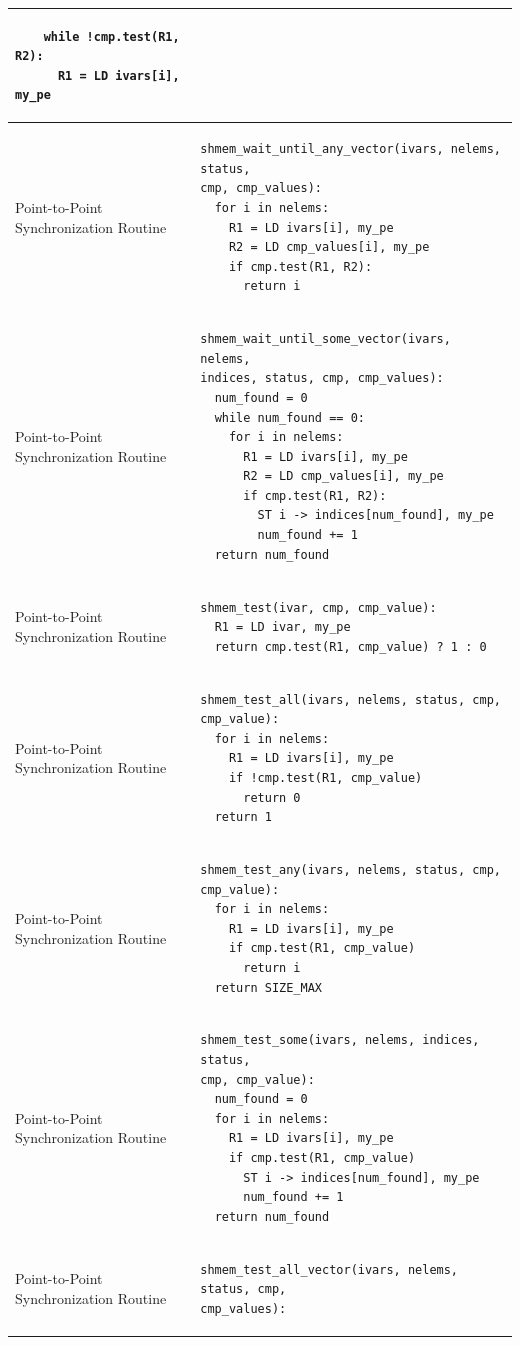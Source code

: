\begin{longtable}{|m{}|m{}|}
\begin{BVerbatim}
    while !cmp.test(R1, R2):
      R1 = LD ivars[i], my_pe
    \end{BVerbatim}
    \tabularnewline\hline
Point-to-Point Synchronization Routine
    & \begin{BVerbatim}
shmem_wait_until_any_vector(ivars, nelems, status,
cmp, cmp_values):
  for i in nelems:
    R1 = LD ivars[i], my_pe
    R2 = LD cmp_values[i], my_pe
    if cmp.test(R1, R2):
      return i
    \end{BVerbatim}
    \tabularnewline\hline
Point-to-Point Synchronization Routine
    & \begin{BVerbatim}
shmem_wait_until_some_vector(ivars, nelems,
indices, status, cmp, cmp_values):
  num_found = 0
  while num_found == 0:
    for i in nelems:
      R1 = LD ivars[i], my_pe
      R2 = LD cmp_values[i], my_pe
      if cmp.test(R1, R2):
        ST i -> indices[num_found], my_pe
        num_found += 1
  return num_found
    \end{BVerbatim}
    \tabularnewline\hline
Point-to-Point Synchronization Routine
    & \begin{BVerbatim}
shmem_test(ivar, cmp, cmp_value):
  R1 = LD ivar, my_pe
  return cmp.test(R1, cmp_value) ? 1 : 0
    \end{BVerbatim}
    \tabularnewline\hline
Point-to-Point Synchronization Routine
    & \begin{BVerbatim}
shmem_test_all(ivars, nelems, status, cmp,
cmp_value):
  for i in nelems:
    R1 = LD ivars[i], my_pe
    if !cmp.test(R1, cmp_value)
      return 0
  return 1
    \end{BVerbatim}
    \tabularnewline\hline
Point-to-Point Synchronization Routine
    & \begin{BVerbatim}
shmem_test_any(ivars, nelems, status, cmp,
cmp_value):
  for i in nelems:
    R1 = LD ivars[i], my_pe
    if cmp.test(R1, cmp_value)
      return i
  return SIZE_MAX
    \end{BVerbatim}
    \tabularnewline\hline
Point-to-Point Synchronization Routine
    & \begin{BVerbatim}
shmem_test_some(ivars, nelems, indices, status,
cmp, cmp_value):
  num_found = 0
  for i in nelems:
    R1 = LD ivars[i], my_pe
    if cmp.test(R1, cmp_value)
      ST i -> indices[num_found], my_pe
      num_found += 1
  return num_found
    \end{BVerbatim}
    \tabularnewline\hline
Point-to-Point Synchronization Routine
    & \begin{BVerbatim}
shmem_test_all_vector(ivars, nelems, status, cmp,
cmp_values):

\end{BVerbatim}
\end{longtable}
